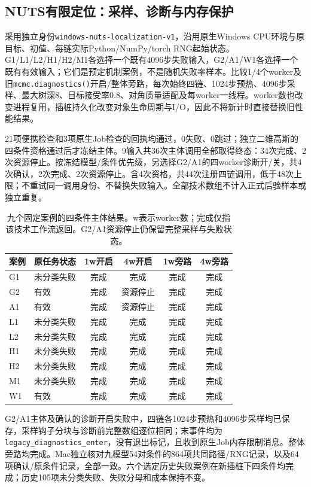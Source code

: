 \subsection{NUTS有限定位：采样、诊断与内存保护}\label{sec:nuts-localization}
采用独立身份\texttt{windows-nuts-localization-v1}，沿用原生Windows CPU环境与原目标、初值、每链实际Python/NumPy/torch RNG起始状态。G1/L1/L2/H1/H2/M1各选择一个既有4096步失败输入，G2/A1/W1各选择一个既有有效输入；它们是预定机制案例，不是随机失败率样本。比较1/4个worker及旧\texttt{mcmc.diagnostics()}开启/整体旁路，每次始终四链、1024步预热、4096步采样、最大树深8、目标接受率0.8、对角质量适配及每worker一线程。worker数也改变进程复用，插桩持久化改变对象生命周期与I/O，因此不将新计时直接替换旧性能结果。

21项便携检查和3项原生Job检查的回执均通过，0失败、0跳过；独立二维高斯的四条件资格通过后才冻结主体。9输入共36次主体调用全部取得终态：34次完成、2次资源停止。按冻结模型/条件优先级，另选择G2/A1的四worker诊断开/关，共4次确认，2次完成、2次资源停止。含4次资格，共44次注册四链调用，低于48次上限；不重试同一调用身份、不替换失败输入。全部技术数组不计入正式后验样本或独立重复。

\begin{table}[htbp]\centering\small
\begin{tabular}{llcccc}\toprule
案例 & 原任务状态 & 1w开启 & 4w开启 & 1w旁路 & 4w旁路\\\midrule
G1 & 未分类失败 & 完成 & 完成 & 完成 & 完成\\
G2 & 有效 & 完成 & 资源停止 & 完成 & 完成\\
A1 & 有效 & 完成 & 资源停止 & 完成 & 完成\\
L1 & 未分类失败 & 完成 & 完成 & 完成 & 完成\\
L2 & 未分类失败 & 完成 & 完成 & 完成 & 完成\\
H1 & 未分类失败 & 完成 & 完成 & 完成 & 完成\\
H2 & 未分类失败 & 完成 & 完成 & 完成 & 完成\\
M1 & 未分类失败 & 完成 & 完成 & 完成 & 完成\\
W1 & 有效 & 完成 & 完成 & 完成 & 完成\\
\bottomrule\end{tabular}
\caption{九个固定案例的四条件主体结果。w表示worker数；完成仅指该技术工作流返回。G2/A1资源停止仍保留完整采样与失败状态。}
\end{table}

G2/A1主体及确认的诊断开启失败中，四链各1024步预热和4096步采样均已保存，采样钩子分块与诊断前完整数组逐位相同；末事件均为\texttt{legacy\_diagnostics\_enter}，没有退出标记，且收到原生Job内存限制消息。整体旁路均完成。Mac独立核对九模型54对条件的864项共同路径/RNG记录，以及64项确认/原条件记录，全部一致。六个选定历史失败案例在新插桩下四条件均完成；历史105项未分类失败、失败分母和成本保持不变。

